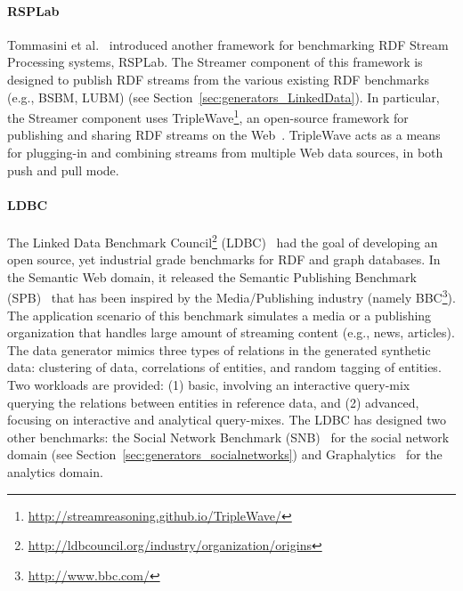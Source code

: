 \paragraph{RSPLab} Tommasini et al.~\cite{tommasini2017rsplab} introduced
another framework for benchmarking RDF Stream Processing systems, RSPLab. The
Streamer component of this framework is designed to publish RDF streams from the
various existing RDF benchmarks (e.g., BSBM, LUBM) (see Section~\ref{sec:generators_LinkedData}).
In particular, the Streamer  component uses TripleWave\footnote{\url{http://streamreasoning.github.io/TripleWave/}}, an
open-source framework for publishing and sharing RDF streams on the
Web~\cite{mauri2016triplewave}.   TripleWave acts as a means for plugging-in
and combining streams from multiple Web data sources, in both push and pull mode.



\paragraph{LDBC}  The Linked Data Benchmark Council\footnote{\url{http://ldbcouncil.org/industry/organization/origins}} (LDBC)~\cite{Angles:2014:LDB:2627692.2627697} %
had the goal of developing an open source, yet industrial grade benchmarks for RDF and graph databases. \iffalse The following three benchmarks were developed and are currently maintained.\fi In the Semantic Web domain, it released the Semantic Publishing Benchmark (SPB)~\cite{spb} that has been inspired by the Media/Publishing industry (namely BBC\footnote{\url{http://www.bbc.com/}}). The application scenario of this benchmark simulates a media or a publishing organization that handles large amount of streaming content (e.g., news, articles). \iffalse This content is enriched with metadata that describes it and links it to reference knowledge -- taxonomies and databases that include relevant concepts, entities and factual information. The SPB data generator produces scalable in size synthetic large data. Synthetic data consists of a large number of annotations of media assets that refer entities found in reference datasets.\fi The data generator mimics three types of relations in the generated synthetic data: clustering of data, correlations of entities, and random tagging of entities. Two workloads are provided: (1) basic, involving an interactive query-mix querying the relations between entities in reference data, and (2) advanced,  focusing on interactive and analytical query-mixes. The LDBC has designed two other benchmarks: the Social Network Benchmark (SNB)~\cite{Erling:2015:LSN:2723372.2742786} for the social network domain  (see Section~\ref{sec:generators_socialnetworks}) and Graphalytics~\cite{Iosup:2016:LGB:3007263.3007270}   for the analytics domain.%



